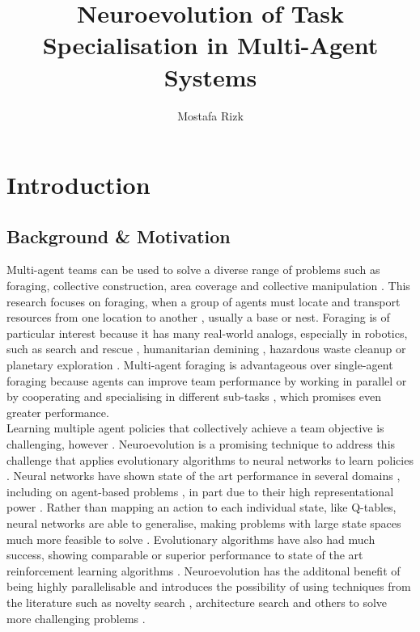 \documentclass[12pt]{article}
\title{Neuroevolution of Task Specialisation in Multi-Agent Systems}
\author{Mostafa Rizk}
\begin{document}
\maketitle

\section{Introduction}

\subsection{Background \& Motivation}

Multi-agent teams can be used to solve a diverse range of problems such as foraging, collective construction, area coverage and collective manipulation \cite{hamann:Springer:2018,bayindir:neuro:2016,brambilla:SI:2013}.
This research focuses on foraging, when a group of agents must locate and transport resources from one location to another \cite{hamann:Springer:2018,bayindir:neuro:2016,brambilla:SI:2013}, usually a base or nest.
Foraging is of particular interest because it has many real-world analogs, especially in robotics, such as search and rescue \cite{hamann:Springer:2018,bayindir:neuro:2016,brambilla:SI:2013, khamis:Springer:2015}, humanitarian demining \cite{bayindir:neuro:2016,brambilla:SI:2013, khamis:Springer:2015}, hazardous waste cleanup \cite{bayindir:neuro:2016} or planetary exploration \cite{bayindir:neuro:2016}. 
Multi-agent foraging is advantageous over single-agent foraging because agents can improve team performance by working in parallel \cite{khamis:Springer:2015, ericksen:SSCI:2017} or by cooperating and specialising in different sub-tasks \cite{ferrante:PLOS_CB:2015, pini:Swarm_Intelligence:2011, pini:ICSI:2012}, which promises even greater performance.\\

Learning multiple agent policies that collectively achieve a team objective is challenging, however \cite{trianni:SCI:2008,francesca:SI:2014}.
Neuroevolution is a promising technique to address this challenge that applies evolutionary algorithms to neural networks to learn policies \cite{stanley:Nature:2019} .
Neural networks have shown state of the art performance in several domains \cite{marcus:arXiv:2018:deep}, including on agent-based problems \cite{marcus:arXiv:2018:innateness}, in part due to their high representational power \cite{such:arXiv:2017}.
Rather than mapping an action to each individual state, like Q-tables, neural networks are able to generalise, making problems with large state spaces much more feasible to solve \cite{such:arXiv:2017}.
Evolutionary algorithms have also had much success, showing comparable or superior performance to state of the art reinforcement learning algorithms \cite{such:arXiv:2017, salimans:arXiv:2017}.
Neuroevolution has the additonal benefit of being highly parallelisable \cite{salimans:arXiv:2017} and introduces the possibility of using techniques from the literature such as novelty search \cite{lehman:Springer:2011, gomes:SI:2013, gomes:EC:2017}, architecture search \cite{elsken:arXiv:2018, wistuba:arXiv:2019} and others to solve more challenging problems \cite{stanley:Nature:2019}.\\
\end{document}
